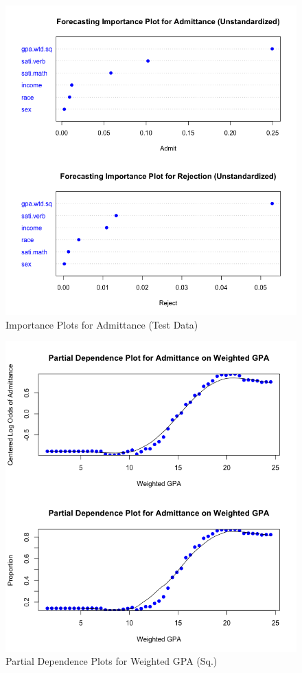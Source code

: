 \documentclass[titlepage]{article}   	%
\begin{document}
\begin{figure} [h]
\centering
\includegraphics[scale=.60]{IMPORTANCE}
\caption{Importance Plots for Admittance (Test Data)}
\end{figure}

\begin{figure} [h]
\centering
\includegraphics[scale=.60]{DEPENDENCE2}
\caption{Partial Dependence Plots for Weighted GPA (Sq.)}
\end{figure}
\end{document}
